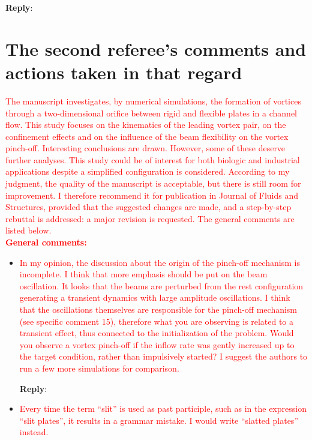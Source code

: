 \documentclass[onecolumn,a4paper,amsmath,amssym,pre]{revtex4}
\begin{document}
{\begin{enumerate}
\textbf{Reply}:

\end{enumerate}	


\newpage

\section*{The second referee's comments and actions taken in that regard} 


\textcolor{red}{The manuscript investigates, by numerical simulations, the formation of vortices through a two-dimensional orifice between rigid and flexible plates in a channel flow. This study focuses on the kinematics of the leading vortex pair, on the confinement effects and on the influence of the beam flexibility on the vortex pinch-off. Interesting conclusions are drawn. However, some of these deserve further analyses. This study could be of interest for both biologic and industrial applications despite a simplified configuration is considered. According to my judgment, the quality of the manuscript is acceptable, but there is still room for improvement. I therefore recommend it for publication in Journal of Fluids and Structures, provided that the suggested changes are made, and a step-by-step rebuttal is addressed: a major revision is requested. The general comments are listed below.}\\

\textcolor{red}{\textbf{General comments:}}\\
\begin{itemize}
\item \textcolor{red}{In my opinion, the discussion about the origin of the pinch-off mechanism is incomplete. I think that more emphasis should be put on the beam oscillation. It looks that the beams are perturbed from the rest configuration generating a transient dynamics with large amplitude oscillations. I think that the oscillations themselves are responsible for the pinch-off mechanism (see specific comment 15), therefore what you are observing is related to a transient effect, thus connected to the initialization of the problem. Would you observe a vortex pinch-off if the inflow rate was gently increased up to the target condition, rather than impulsively started? I suggest the authors to run a few more simulations for comparison.}

\textbf{Reply}:

\item \textcolor{red}{Every time the term “slit” is used as past participle, such as in the expression “slit plates”, it results in a grammar mistake. I would write “slatted plates” instead.}


\end{itemize}}
\end{document}
